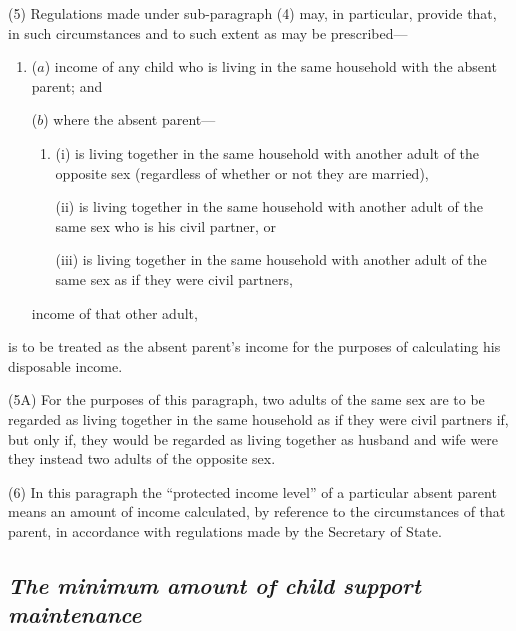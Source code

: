 \documentclass[12pt,a4paper]{article}
\begin{document}
(5) Regulations made under sub-paragraph (4)  may, in particular, provide that, in such circumstances and to such extent as may be prescribed—
\begin{enumerate}\item[]
($a$) income of any child who is living in the same household with the absent parent; and


($b$) where the absent parent—
\begin{enumerate}\item[]
(i) is living together in the same household with another adult of the opposite sex (regardless of whether or not they are married),

(ii) is living together in the same household with another adult of the same sex who is his civil partner, or

(iii) is living together in the same household with another adult of the same sex as if they were civil partners,
\end{enumerate}
income of that other adult,
\end{enumerate}
is to be treated as the absent parent’s income for the purposes of calculating his disposable income.

(5A) For the purposes of this paragraph, two adults of the same sex are to be regarded as living together in the same household as if they were civil partners if, but only if, they would be regarded as living together as husband and wife were they instead two adults of the opposite sex.

(6) In this paragraph the “protected income level” of a particular absent parent means an amount of income calculated, by reference to the circumstances of that parent, in accordance with regulations made by the Secretary of State.


\subsection*{\itshape The minimum amount of child support maintenance}
\end{document}
